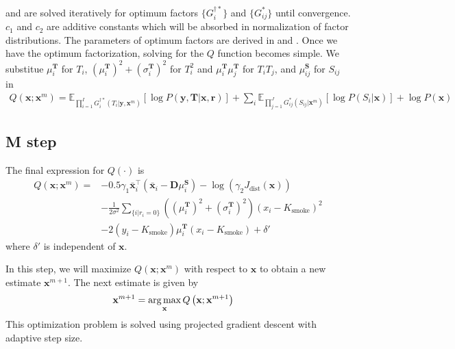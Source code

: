  and  are solved iteratively for optimum factors $ \lbrace G^{\dagger*}_i \rbrace $ and $ \lbrace G_{ij}^* \rbrace $ until convergence. $c_1$ and $c_2$ are additive constants which will be absorbed in normalization of factor distributions. The parameters of optimum factors are derived in  and .  Once we have the optimum factorization, solving for the $Q$ function becomes simple. We substitue $\mu^\mathbf{T}_i$ for $T_i$, $\left( \mu^\mathbf{T}_i \right)^2 + \left( \sigma^\mathbf{T}_i \right)^2$ for $T_i^2$ and $\mu^\mathbf{T}_i \mu^\mathbf{T}_j $ for $T_i T_j$, and $\mu^\mathbf{S}_{ij}$ for $S_{ij}$ in
\begin{align}
Q(\mathbf{x}; \mathbf{x}^m) = \mathbb{E}_{ \prod_{i=1}^{I} G^{\dagger*}_i (T_i | \mathbf{y}, \mathbf{x}^m) } \left[ \log P \left( \mathbf{y}, \mathbf{T} | \mathbf{x}, \mathbf{r} \right) \right] + \sum_i \mathbb{E}_{ \prod_{j=1}^{J} G^*_{ij} \left( S_{ij} | \mathbf{x}^m \right) } \left[ \log P \left( S_i | \mathbf{x} \right) \right] + \log P \left( \mathbf{x} \right)
\end{align}


\subsection{M step}
The final expression for $Q \left( \cdot \right)$ is
\begin{equation}
\begin{split}
Q\left( \mathbf{x}; \mathbf{x}^m \right) =  &-0.5 \gamma_1 \mathbf{\bar{x}}^\intercal_i \left( \mathbf{\bar{x}}_i -  \mathbf{D} \mu^\mathbf{S}_i \right) - \log \left( \gamma_2 J_\text{dist}\left( \mathbf{x} \right) \right) \\
&- \frac{1}{2 \sigma^2} \sum_{\{i | r_i = 0 \}}  \left(
\left(\mu^\mathbf{T}_i\right)^2 + \left(\sigma^\mathbf{T}_i\right)^2\right) \left(x_i - K_\text{smoke}\right)^2 \\
&- 2 \left(y_i - K_\text{smoke}\right) \mu^\mathbf{T}_i \left(x_i - K_\text{smoke} \right) + \delta'
\end{split}
\end{equation}
where $\delta'$ is independent of $\mathbf{x}$.

In this step, we will maximize $Q(\mathbf{x}; \mathbf{x}^m)$ with respect to $\mathbf{x}$ to obtain a new estimate $\mathbf{x}^{m+1}$. The next estimate is given by
\begin{align}
    \mathbf{x}^{m+1} &= \operatorname*{arg\,max}_{\mathbf{x}} Q \left( \mathbf{x}; \mathbf{x}^{m+1} \right) \label{eqn:mStep}
\end{align}
This optimization problem is solved using projected gradient descent with adaptive step size.



